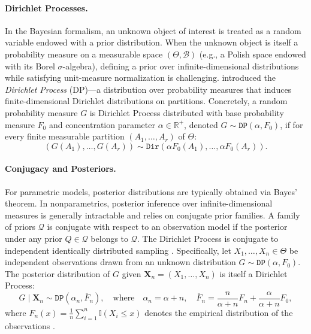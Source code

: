 \documentclass[10pt]{article}
\newcommand{\Dir}{\texttt{Dir}}
\newcommand{\DP}{\texttt{DP}}
\begin{document}
\paragraph{Dirichlet Processes.}
In the Bayesian formalism, an unknown object of interest is treated as a random variable endowed with a prior distribution. When the unknown object is itself a probability measure on a measurable space $(\Theta, \mathcal{B})$ (e.g., a Polish space endowed with its Borel $\sigma$-algebra), defining a prior over infinite-dimensional distributions while satisfying unit-measure normalization is challenging. \citet{ferguson1973bayesian} introduced the \emph{Dirichlet Process} (DP)---a distribution over probability measures that induces finite-dimensional Dirichlet distributions on partitions. Concretely, a random probability measure $G$ is Dirichlet Process distributed with base probability measure $F_0$ and concentration parameter $\alpha \in \mathbb{R}^{+}$, denoted $G \sim \DP(\alpha, F_0)$, if for every finite measurable partition $(A_1, \dots, A_r)$ of $\Theta$:
\begin{equation}
(G(A_1), \dots, G(A_r)) \sim \Dir(\alpha F_0(A_1), \dots, \alpha F_0(A_r)).
\end{equation}

\paragraph{Conjugacy and Posteriors.}
For parametric models, posterior distributions are typically obtained via Bayes' theorem. In nonparametrics, posterior inference over infinite-dimensional measures is generally intractable and relies on conjugate prior families. A family of priors $\mathcal{Q}$ is conjugate with respect to an observation model if the posterior under any prior $Q \in \mathcal{Q}$ belongs to $\mathcal{Q}$. The Dirichlet Process is conjugate to independent identically distributed sampling \citep{ferguson1973bayesian}. Specifically, let $X_1, \dots, X_n \in \Theta$ be independent observations drawn from an unknown distribution $G \sim \DP(\alpha, F_0)$. The posterior distribution of $G$ given $\mathbf{X}_n = (X_1, \dots, X_n)$ is itself a Dirichlet Process:
\begin{equation} \label{def:DP-posteriors}
G \mid \mathbf{X}_n \sim \DP(\alpha_n, \overline{F}_n), \quad \text{where} \quad \alpha_n = \alpha + n, \quad \overline{F}_n = \frac{n}{\alpha+n}{F}_n + \frac{\alpha}{\alpha+n}F_0,
\end{equation}
where $F_n(x) = \frac{1}{n}\sum_{i=1}^{n}\mathbb{I}(X_{i} \le x)$ denotes the empirical distribution of the observations \citep{ghosal2010dirichlet}.
\end{document}
